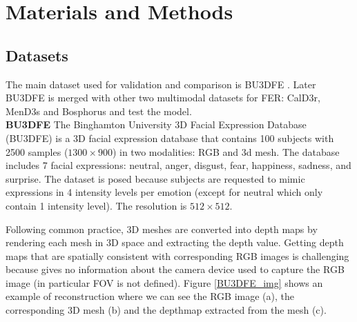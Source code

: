 \section{Materials and Methods}

\subsection{Datasets}
The main dataset used for validation and comparison is BU3DFE \cite{BU3DFE}. Later BU3DFE is merged with other two multimodal datasets for FER: CalD3r, MenD3s \cite{CalD3rMenD3s} and Bosphorus \cite{Bosphorus} and test the model. \\

\textbf{BU3DFE} \hspace{0.2cm} The Binghamton University 3D Facial Expression Database (BU3DFE) \cite{BU3DFE} is a 3D facial expression database that contains 100 subjects with 2500 samples ($1300\times900$) in two modalities: RGB and 3d mesh. The database includes 7 facial expressions: neutral, anger, disgust, fear, happiness, sadness, and surprise. The dataset is posed because subjects are requested to mimic expressions in 4 intensity levels per emotion (except for neutral which only contain 1 intensity level). The resolution is $512\times512$. 

Following common practice, 3D meshes are converted into depth maps by rendering each mesh in 3D space and extracting the depth value. Getting depth maps that are spatially consistent with corresponding RGB images is challenging because \cite{BU3DFE} gives no information about the camera device used to capture the RGB image (in particular FOV is not defined). Figure \ref{BU3DFE_img} shows an example of reconstruction where we can see the RGB image (a), the corresponding 3D mesh (b) and the depthmap extracted from the mesh (c).\\

